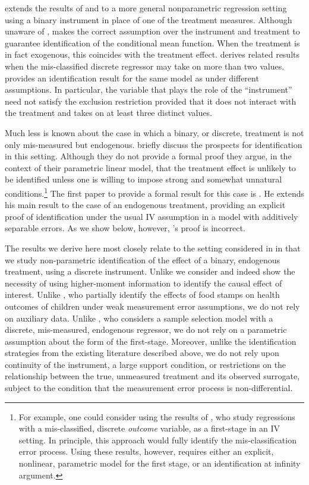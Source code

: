 \cite{Mahajan} extends the results of \cite{BBS} and \cite{KRS} to a more general nonparametric regression setting using a binary instrument in place of one of the treatment measures. 
Although unaware of \cite{FL}, \cite{Mahajan} makes the correct assumption over the instrument and treatment to guarantee identification of the conditional mean function.
When the treatment is in fact exogenous, this coincides with the treatment effect.
\cite{hu2008} derives related results when the mis-classified discrete regressor may take on more than two values.
\cite{Lewbel} provides an identification result for the same model as \cite{Mahajan} under different assumptions.
In particular, the variable that plays the role of the ``instrument'' need not satisfy the exclusion restriction provided that it does not interact with the treatment and takes on at least three distinct values. 

Much less is known about the case in which a binary, or discrete, treatment is not only mis-measured but endogenous.
\cite{FL} briefly discuss the prospects for identification in this setting.
Although they do not provide a formal proof they argue, in the context of their parametric linear model, that the treatment effect is unlikely to be identified unless one is willing to impose strong and somewhat unnatural conditions.\footnote{For example, one could consider using the results of \cite{Hausman}, who study regressions with a mis-classified, discrete \emph{outcome} variable, as a first-stage in an IV setting. In principle, this approach would fully identify the mis-classification error process. Using these results, however, requires either an explicit, nonlinear, parametric model for the first stage, or an identification at infinity argument.} 
The first paper to provide a formal result for this case is \cite{Mahajan}.
He extends his main result to the case of an endogenous treatment, providing an explicit proof of identification under the usual IV assumption in a model with additively separable errors.
As we show below, however, \citeauthor{Mahajan}'s proof is incorrect.

The results we derive here most closely relate to the setting considered in \cite{Mahajan} in that we study non-parametric identification of the effect of a binary, endogenous treatment, using a discrete instrument.
Unlike \cite{Mahajan} we consider and indeed show the necessity of using higher-moment information to identify the causal effect of interest.
Unlike \cite{kreider2012}, who partially identify the effects of food stamps on health outcomes of children under weak measurement error assumptions, we do not rely on auxiliary data. 
Unlike \cite{shiu2015}, who considers a sample selection model with a discrete, mis-measured, endogenous regressor, we do not rely on a parametric assumption about the form of the first-stage.
Moreover, unlike the identification strategies from the existing literature described above, we do not rely upon continuity of the instrument, a large support condition, or restrictions on the relationship between the true, unmeasured treatment and its observed surrogate, subject to the condition that the measurement error process is non-differential.


